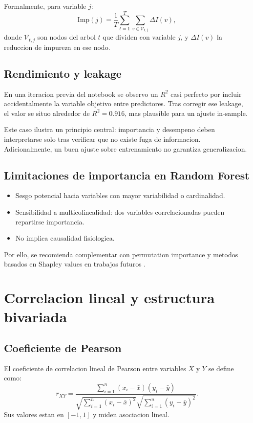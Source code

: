 \documentclass[12pt,a4paper,oneside]{report}
\begin{document}
Formalmente, para variable $j$:
\[
\mathrm{Imp}(j) = \frac{1}{T}\sum_{t=1}^{T}\sum_{v \in \mathcal{V}_{t,j}} \Delta I(v),
\]
donde $\mathcal{V}_{t,j}$ son nodos del arbol $t$ que dividen con variable $j$, y $\Delta I(v)$ la reduccion de impureza en ese nodo.

\section{Rendimiento y leakage}

En una iteracion previa del notebook se observo un $R^2$ casi perfecto por incluir accidentalmente la variable objetivo entre predictores. Tras corregir ese leakage, el valor se situo alrededor de $R^2=0.916$, mas plausible para un ajuste in-sample.

Este caso ilustra un principio central: importancia y desempeno deben interpretarse solo tras verificar que no existe fuga de informacion. Adicionalmente, un buen ajuste sobre entrenamiento no garantiza generalizacion.

\section{Limitaciones de importancia en Random Forest}

\begin{itemize}
\item Sesgo potencial hacia variables con mayor variabilidad o cardinalidad.
\item Sensibilidad a multicolinealidad: dos variables correlacionadas pueden repartirse importancia.
\item No implica causalidad fisiologica.
\end{itemize}

Por ello, se recomienda complementar con permutation importance y metodos basados en Shapley values en trabajos futuros \cite{fisher2019,lundberg2017}.

\chapter{Correlacion lineal y estructura bivariada}

\section{Coeficiente de Pearson}

El coeficiente de correlacion lineal de Pearson entre variables $X$ y $Y$ se define como:
\[
r_{XY} = \frac{\sum_{i=1}^{n}(x_i-\bar{x})(y_i-\bar{y})}{\sqrt{\sum_{i=1}^{n}(x_i-\bar{x})^2}\sqrt{\sum_{i=1}^{n}(y_i-\bar{y})^2}}.
\]
Sus valores estan en $[-1,1]$ y miden asociacion lineal.
\end{document}
